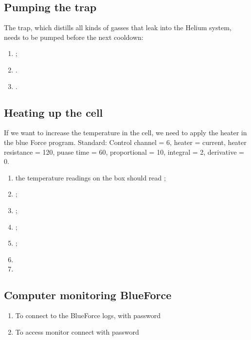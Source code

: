  \subsection{Pumping the trap}
 The trap, which distills all kinds of gasses that leak into the Helium system,
 needs to be pumped before the next cooldown:
 \begin{enumerate}
   \item {};
   \item {}. 
   \item {}.
 \end{enumerate}

 \subsection{Heating up the cell}
 If we want to increase the temperature in the cell, we need to apply the heater
 in the blue Force program. Standard: Control channel = 6, heater = current,
 heater resistance = 120, puase time = 60, proportional = 10, integral = 2,
 derivative = 0.
 \begin{enumerate}
   \item {} \ira {} \ira the temperature
         readings on the box should read ;
   \item {};
   \item {};
   \item {} ;
   \item {};
   \item {}
   \item {}
         \ira {} \ira {}
 \end{enumerate}

 \subsection{Computer monitoring BlueForce}
 \label{sec:comp-monit-bluef}

 \begin{enumerate}
   \item To connect to the BlueForce logs,  with password
   \item To access monitor connect  with password
 \end{enumerate}
 \newpage
